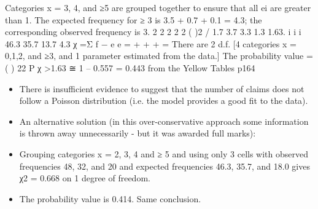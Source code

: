 \documentclass[a4paper,12pt]{article}
\begin{document}
Categories x = 3, 4, and ≥5 are grouped together to ensure that all ei are greater than 1.
The expected frequency for ≥ 3 is 3.5 + 0.7 + 0.1 = 4.3; the corresponding observed
frequency is 3.
2 2 2 2
2 ( )2 / 1.7 3.7 3.3 1.3 1.63.
i i i 46.3 35.7 13.7 4.3 χ =Σ f − e e = + + + =
There are 2 d.f. [4 categories x = 0,1,2, and ≥3, and 1 parameter estimated from the
data.]
The probability value =
( ) 22
P χ >1.63 ≅ 1 – 0.557 = 0.443 from the Yellow Tables p164
\begin{itemize}
    \item There is insufficient evidence to suggest that the number of claims does not follow a
Poisson distribution (i.e. the model provides a good fit to the data).
\item An alternative solution (in this over-conservative approach some information is
thrown away unnecessarily - but it was awarded full marks):
\item Grouping categories x = 2, 3, 4 and ≥ 5 and using only 3 cells with observed
frequencies 48, 32, and 20 and expected frequencies 46.3, 35.7, and 18.0 gives χ2 =
0.668 on 1 degree of freedom. 
\item The probability value is 0.414. Same conclusion.
\end{itemize}
\end{document}
